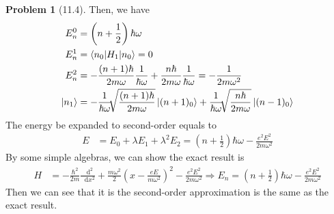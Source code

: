 \documentclass[twoside,11pt]{article}
\renewcommand*\d{\mathop{}\!\mathrm{d}}
\theoremstyle{definition}
\newtheorem{problem}{Problem}
\theoremstyle{remark}
\begin{document}
\begin{problem}[11.4]
Then, we have
\begin{align*}
    E_n^0 &= \left(n+\frac{1}{2}\right)\hbar\omega\\
    E^1_n &= \braket{n_0|H_1|n_0} = 0\\
    E^2_n &= -\frac{(n+1)\hbar}{2m\omega}\frac{1}{\hbar\omega} + \frac{n\hbar}{2m\omega}\frac{1}{\hbar\omega}
    = -\frac{1}{2m\omega^2}\\
    \ket{n_1} &= -\frac{1}{\hbar\omega}\sqrt[]{\frac{(n+1)\hbar}{2m\omega}}\ket{(n+1)_0}
    + \frac{1}{\hbar\omega}\sqrt[]{\frac{n\hbar}{2m\omega}}\ket{(n-1)_0}
\end{align*}
The energy be expanded to second-order equals to 
\begin{align*}
    E &= E_0 + \lambda E_1 + \lambda^2 E_2 
    = \left(n+\frac{1}{2}\right)\hbar\omega - \frac{e^2E^2}{2m\omega^2}
\end{align*}
By some simple algebras, we can show the exact result is
\begin{align*}
    H &= -\frac{\hbar^2}{2m}\frac{\d^2}{\d x^2}
    + \frac{m\omega^2}{2}\left(x-\frac{eE}{m\omega^2}\right)^2
    - \frac{e^2E^2}{2m\omega^2}\Rightarrow
    E_n = \left(n+\frac{1}{2}\right)\hbar\omega - \frac{e^2E^2}{2m\omega^2}
\end{align*}
Then we can see that it is the second-order approximation is the same as the exact result.
\end{problem}





\end{document}
